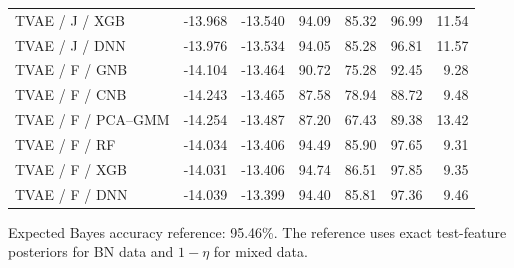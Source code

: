 \documentclass[11pt,letterpaper]{article}
\begin{document}
\begin{table}[H]
\begin{tabular}{lrrrrrr}
TVAE / J / XGB & -13.968 & -13.540 & 94.09 & 85.32 & 96.99 & 11.54\\
TVAE / J / DNN & -13.976 & -13.534 & 94.05 & 85.28 & 96.81 & 11.57\\
TVAE / F / GNB & -14.104 & -13.464 & 90.72 & 75.28 & 92.45 & 9.28\\
TVAE / F / CNB & -14.243 & -13.465 & 87.58 & 78.94 & 88.72 & 9.48\\
TVAE / F / PCA--GMM & -14.254 & -13.487 & 87.20 & 67.43 & 89.38 & 13.42\\
TVAE / F / RF & -14.034 & -13.406 & 94.49 & 85.90 & 97.65 & 9.31\\
TVAE / F / XGB & -14.031 & -13.406 & 94.74 & 86.51 & 97.85 & 9.35\\
TVAE / F / DNN & -14.039 & -13.399 & 94.40 & 85.81 & 97.36 & 9.46\\
\bottomrule\end{tabular}
\end{table}
Expected Bayes accuracy reference: 95.46\%. The reference uses exact test-feature posteriors for BN data and $1-\eta$ for mixed data.
\end{document}
